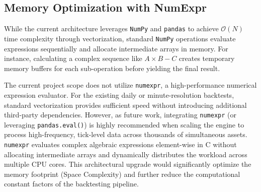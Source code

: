 \subsection{Memory Optimization with NumExpr}

While the current architecture leverages \texttt{NumPy} and \texttt{pandas} to achieve \(\mathcal{O}(N)\) time complexity through vectorization, standard \texttt{NumPy} operations evaluate expressions sequentially and allocate intermediate arrays in memory. For instance, calculating a complex sequence like \( A \times B - C \) creates temporary memory buffers for each sub-operation before yielding the final result.

The current project scope does not utilize \texttt{numexpr}, a high-performance numerical expression evaluator. For the existing daily or minute-resolution backtests, standard vectorization provides sufficient speed without introducing additional third-party dependencies. However, as future work, integrating \texttt{numexpr} (or leveraging \texttt{pandas.eval()}) is highly recommended when scaling the engine to process high-frequency, tick-level data across thousands of simultaneous assets. \texttt{numexpr} evaluates complex algebraic expressions element-wise in C without allocating intermediate arrays and dynamically distributes the workload across multiple CPU cores. This architectural upgrade would significantly optimize the memory footprint (Space Complexity) and further reduce the computational constant factors of the backtesting pipeline.

